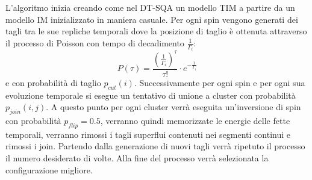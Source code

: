 L'algoritmo inizia creando come nel DT-SQA un modello TIM a partire da un modello IM inizializzato in maniera casuale.
Per ogni spin vengono generati dei tagli tra le sue repliche temporali dove la posizione di taglio è ottenuta attraverso il processo di Poisson con tempo di decadimento $\frac{1}{\Gamma_i}$:
$$P(\tau) = \frac{(\frac{1}{\Gamma_i})^\tau}{\tau!} \cdot e^{-\frac{1}{\Gamma_i}}$$
e con probabilità  di taglio $p_{cut}(i)$.
Successivamente per ogni spin e per ogni sua evoluzione temporale si esegue un tentativo di unione a cluster con probabilità $p_{join}(i,j)$.
A questo punto per ogni cluster verrà eseguita un'inversione di spin con probabilità $p_{flip} = 0.5$, verranno quindi memorizzate le energie delle fette temporali, verranno rimossi i tagli superflui contenuti nei segmenti continui e rimossi i join.
Partendo dalla generazione di nuovi tagli verrà ripetuto il processo il numero desiderato di volte.
Alla fine del processo verrà selezionata la configurazione migliore.
